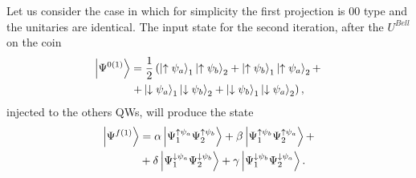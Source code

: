 \documentclass[
	aps, pra,
	superscriptaddress, twocolumn,
	floatfix,
	10pt
]{revtex4-1}
\begin{document}
Let us consider the case in which for simplicity the first projection is 00 type and the unitaries are identical. The input state for the second iteration, after the $U^{Bell}$ on the coin
\begin{align}
     \ket{\Psi^{0 (1)}} &= \frac{1}{2}\left(\ket{\uparrow \psi_a}_1 \ket{\uparrow \psi_b}_2 +\ket{\uparrow \psi_b}_1 \ket{\uparrow \psi_a}_2 + \right. \notag\\
      &\left. + \ket{\downarrow \psi_a}_1 \ket{\downarrow \psi_b}_2 +
     \ket{\downarrow \psi_b}_1 \ket{\downarrow \psi_a}_2
     \right),
\end{align}
injected to the others QWs, will produce the state
\begin{align}
     \ket{\Psi^{f(1)}} &=
     \alpha \ket{\Psi^{\uparrow \psi_a}_1\Psi^{\uparrow \psi_b}_2} +
     \beta \ket{\Psi^{\uparrow \psi_b}_1\Psi^{\uparrow \psi_a}_2} +  \notag \\
        &+ \delta \ket{\Psi^{\downarrow \psi_a}_1\Psi^{\downarrow \psi_b}_2} 
         + \gamma \ket{\Psi^{\downarrow \psi_b}_1\Psi^{\downarrow \psi_a}_2}.
\label{eq:final_state1}                 
\end{align}
\end{document}
